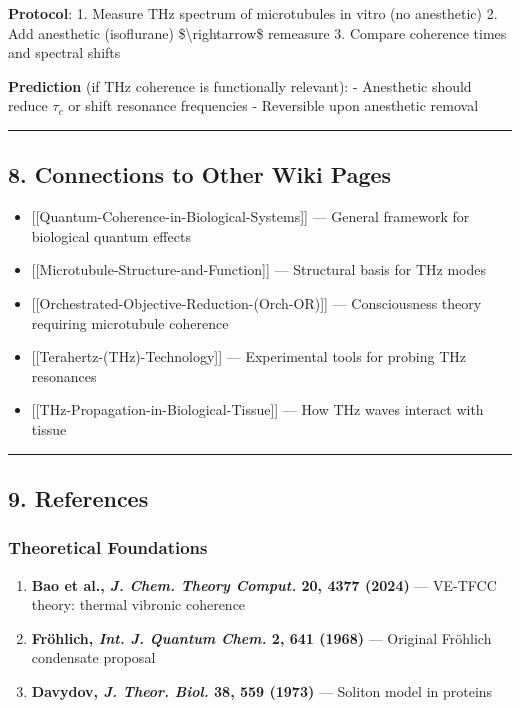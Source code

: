 \textbf{Protocol}: 1. Measure THz spectrum of microtubules in vitro (no
anesthetic) 2. Add anesthetic (isoflurane) \$\textbackslash rightarrow\$
remeasure 3. Compare coherence times and spectral shifts

\textbf{Prediction} (if THz coherence is functionally relevant): -
Anesthetic should reduce \(\tau_c\) or shift resonance frequencies -
Reversible upon anesthetic removal

\begin{center}\rule{0.5\linewidth}{0.5pt}\end{center}

\subsection{8. Connections to Other Wiki
Pages}\label{connections-to-other-wiki-pages}

\begin{itemize}
\tightlist
\item
  {[}{[}Quantum-Coherence-in-Biological-Systems{]}{]} --- General
  framework for biological quantum effects
\item
  {[}{[}Microtubule-Structure-and-Function{]}{]} --- Structural
  basis for THz modes
\item
  {[}{[}Orchestrated-Objective-Reduction-(Orch-OR){]}{]} ---
  Consciousness theory requiring microtubule coherence
\item
  {[}{[}Terahertz-(THz)-Technology{]}{]} --- Experimental tools for
  probing THz resonances
\item
  {[}{[}THz-Propagation-in-Biological-Tissue{]}{]} --- How THz waves
  interact with tissue
\end{itemize}

\begin{center}\rule{0.5\linewidth}{0.5pt}\end{center}

\subsection{9. References}\label{references}

\subsubsection{Theoretical Foundations}\label{theoretical-foundations}

\begin{enumerate}
\def\labelenumi{\arabic{enumi}.}
\tightlist
\item
  \textbf{Bao et al., \emph{J. Chem. Theory Comput.} 20, 4377 (2024)}
  --- VE-TFCC theory: thermal vibronic coherence
\item
  \textbf{Fröhlich, \emph{Int. J. Quantum Chem.} 2, 641 (1968)} ---
  Original Fröhlich condensate proposal
\item
  \textbf{Davydov, \emph{J. Theor. Biol.} 38, 559 (1973)} ---
  Soliton model in proteins
\end{enumerate}

